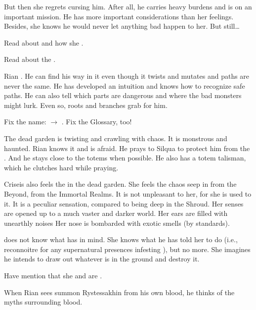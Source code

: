 \begin{changes}
    But then she regrets cursing him. 
    After all, he carries heavy burdens and is on an important mission. 
    He has more important considerations than her feelings. 
    Besides, she knows he would never let anything bad happen to her. 
    But still\ldots{}
    
    Read about \Criseis and how she .
    
    \begin{comment}
      \subparagraph{Dead garden}
    \end{comment}
    Read about the . 
    
    Rian .
    He can find his way in it even though it twists and mutates and paths are never the same.
    He has developed an intuition and knows how to recognize safe paths.
    He can also tell which parts are dangerous and where the bad monsters might lurk.
    Even so, roots and branches grab for him.

    
    Fix the name: 
    \Rystessakhin{} $\to$ \AeocrithRystessakhin. 
    Fix the Glossary, too! 
    
    The dead garden is twisting and crawling with chaos.
    It is monstrous and haunted.
    Rian knows it and is afraid.
    He prays to Silqua to protect him from the \wylde.
    And he stays close to the totems when possible.
    He also has a totem talisman, which he clutches hard while praying.
    
    Criseis also feels the \wylde in the dead garden.
    She feels the chaos seep in from the Beyond, from the Immortal Realms.
    It is not unpleasant to her, for she is used to it.
    It is a peculiar sensation, compared to being deep in the Shroud.
    Her senses are opened up to a much vaster and darker world.
    Her ears are filled with unearthly noises
    Her nose is bombarded with exotic smells (by \Azmithian standards).

    \Criseis does not know what \Ishnaruchaefir has in mind. 
    She knows what he has told her to do (i.e., reconnoitre for any supernatural presences infesting \Malcur), but no more.
    She imagines he intends to draw out whatever is in the ground and destroy it.
    
    Have \Criseis{} mention that she and \Ishnaruchaefir{} are . 
    
    When Rian sees \Ishnaruchaefir summon Rystessakhin from his own blood, he thinks of the myths surrounding \dragon blood.


\end{changes}
